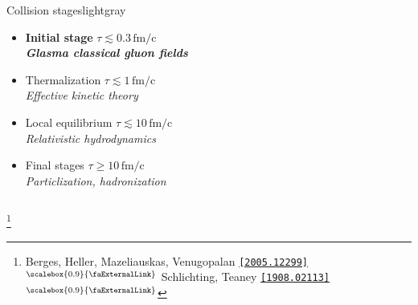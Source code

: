 \documentclass[aspectratio=169,11pt,usenames,dvipsnames]{beamer}
\renewcommand{\thefootnote}{}
\newcommand\blfootnote[1]{%
  \begingroup
  \renewcommand\thefootnote{}\footnote{#1}%
  \addtocounter{footnote}{-1}%
  \endgroup
}
\begin{document}
\begin{frame}
\begin{columns}[onlytextwidth,t]
\begin{center}
\begin{custombox2}{\color{normal}Collision stages}{lightgray}
\begin{varwidth}{0.74\textwidth}
\begin{itemize}
                        {\color{lightgray}\scriptsize\itshape High-energy gluon fields}
                     \item {{\bfseries\color{palviolet} Initial stage} {\scriptsize $\tau\lesssim
                    0.3\,\mathrm{fm/c}$}}\\[1pt]
                        {\color{lightgray}\scriptsize\itshape {\bfseries\color{palviolet}Glasma classical gluon fields}}
                     \item Thermalization {\scriptsize$\tau\lesssim
                    1\,\mathrm{fm/c}$}\\[1pt] 
                        {\color{lightgray}\scriptsize\itshape Effective kinetic theory} 
                    \item Local equilibrium {\scriptsize $\tau\lesssim 10\,\mathrm{fm/c}$}\\[1pt]
                    {\color{lightgray}\scriptsize\itshape Relativistic hydrodynamics} 
                    \item Final stages {\scriptsize $\tau\geq 10\,\mathrm{fm/c}$}\\[1pt]
                    {\color{lightgray}\scriptsize\itshape Particlization, hadronization}
                \end{itemize}
                \end{varwidth}
            \end{custombox2}
            \end{center}
    \end{columns}
    \blfootnote{\scriptsize Berges, Heller, Mazeliauskas, Venugopalan \href{https://arxiv.org/abs/2005.12299}{{\color{palgold}\texttt{[2005.12299]$^\text{\scalebox{0.9}{\faExternalLink}}$}}} Schlichting, Teaney \href{https://arxiv.org/abs/1908.02113}{{\color{palgold}\texttt{[1908.02113]$^\text{\scalebox{0.9}{\faExternalLink}}$}}}}

\end{frame}
\end{document}
